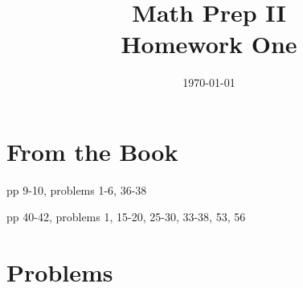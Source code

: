 \documentclass[letterpaper, landscape]{exam}
\title{Math Prep II \\ Homework One}
\author{}
\date{\today}
\begin{document}
  \maketitle

  \section{From the Book} %
  \label{sec:Homework}
  
  \begin{itemize*}
    \item pp 9-10, problems 1-6, 36-38
    \item pp 40-42, problems 1, 15-20, 25-30, 33-38, 53, 56
  \end{itemize*}

  \section{Problems}
\end{document}
